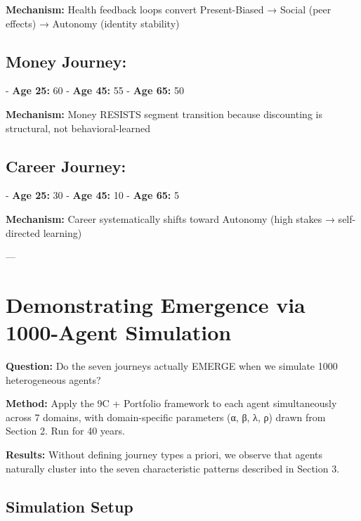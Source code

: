 \textbf{Mechanism:} Health feedback loops convert Present-Biased → Social (peer effects) → Autonomy (identity stability)

\subsection{Money Journey:}
- \textbf{Age 25:} 60%
- \textbf{Age 45:} 55%
- \textbf{Age 65:} 50%

\textbf{Mechanism:} Money RESISTS segment transition because discounting is structural, not behavioral-learned

\subsection{Career Journey:}
- \textbf{Age 25:} 30%
- \textbf{Age 45:} 10%
- \textbf{Age 65:} 5%

\textbf{Mechanism:} Career systematically shifts toward Autonomy (high stakes → self-directed learning)

---


\section{Demonstrating Emergence via 1000-Agent Simulation}
\label{sec:abm-emergence}

\textbf{Question:} Do the seven journeys actually EMERGE when we simulate 1000 heterogeneous agents?

\textbf{Method:} Apply the 9C + Portfolio framework to each agent simultaneously across 7 domains, with domain-specific parameters (α, β, λ, ρ) drawn from Section 2. Run for 40 years.

\textbf{Results:} Without defining journey types a priori, we observe that agents naturally cluster into the seven characteristic patterns described in Section 3.

\subsection{Simulation Setup}

